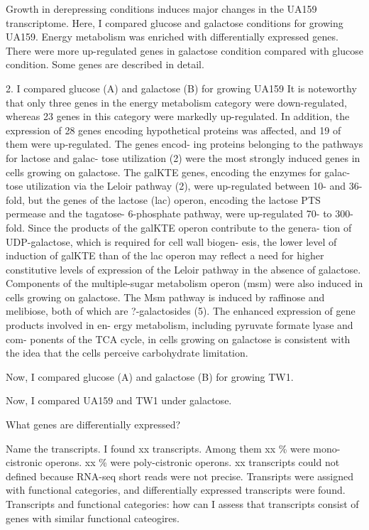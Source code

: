 \documentclass{article}
\begin{document}
Growth in derepressing conditions induces major changes in the UA159
transcriptome. Here, I compared glucose and galactose conditions for growing
UA159. Energy metabolism was enriched with differentially expressed genes. There
were more up-regulated genes in galactose condition compared with glucose
condition. Some genes are described in detail. 

2. I compared glucose (A) and galactose (B) for growing UA159
It is noteworthy that only three genes in the energy metabolism category were
down-regulated, whereas 23 genes in this category were markedly up-regulated. In
addition, the expression of 28 genes encoding hypothetical proteins was affected,
and 19 of them were up-regulated. The genes encod- ing proteins belonging to the
pathways for lactose and galac- tose utilization (2) were the most strongly
induced genes in cells growing on galactose. The galKTE genes, encoding the
enzymes for galac- tose utilization via the Leloir pathway (2), were
up-regulated between 10- and 36-fold, but the genes of the lactose (lac) operon,
encoding the lactose PTS permease and the tagatose- 6-phosphate pathway, were
up-regulated 70- to 300-fold. Since the products of the galKTE operon contribute
to the genera- tion of UDP-galactose, which is required for cell wall biogen-
esis, the lower level of induction of galKTE than of the lac operon may reflect
a need for higher constitutive levels of expression of the Leloir pathway in the
absence of galactose. Components of the multiple-sugar metabolism operon (msm)
were also induced in cells growing on galactose. The Msm pathway is induced by
raffinose and melibiose, both of which are ?-galactosides (5). The enhanced
expression of gene products involved in en- ergy metabolism, including pyruvate
formate lyase and com- ponents of the TCA cycle, in cells growing on galactose
is consistent with the idea that the cells perceive carbohydrate limitation. 

Now, I compared glucose (A) and galactose (B) for growing TW1. 

Now, I compared UA159 and TW1 under galactose. 

What genes are differentially expressed? 

Name the transcripts.
I found xx transcripts. Among them xx \% were mono-cistronic operons. xx \% were
poly-cistronic operons. xx transcripts could not defined because RNA-seq short
reads were not precise. Transripts were assigned with functional categories, and
differentially expressed transcripts were found. Transcripts and functional
categories: how can I assess that transcripts consist of genes with similar
functional cateogires. 
\end{document}
